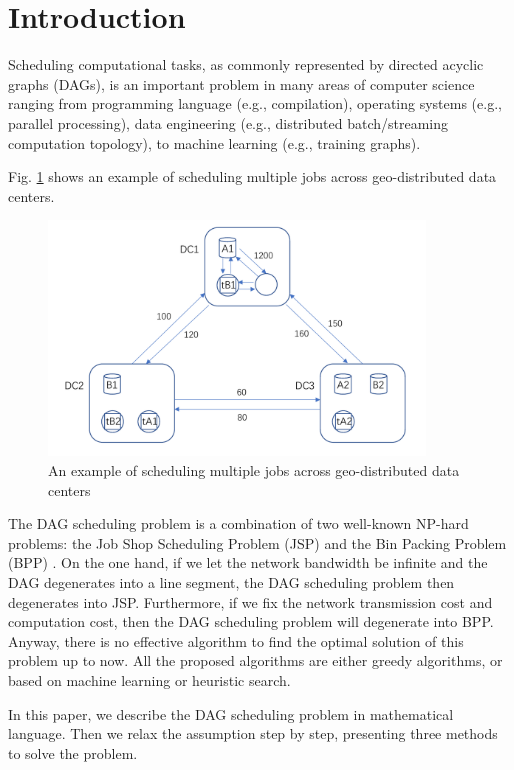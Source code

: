 \documentclass{llncs}
\begin{document}
\section{Introduction}

    Scheduling computational tasks, as commonly represented by directed acyclic graphs (DAGs), is an important problem in many areas of computer science ranging from programming language (e.g., compilation), operating systems (e.g., parallel processing), data engineering (e.g., distributed batch/streaming computation topology), to machine learning (e.g., training graphs). 
    
    Fig. \ref{fig:intro} shows an example of scheduling multiple jobs across geo-distributed data centers.
    \begin{figure}
        \centering
        \includegraphics[width=10cm]{Figures/Intro.pdf}
        \caption{An example of scheduling multiple jobs across
            geo-distributed data centers}
        \label{fig:intro}
    \end{figure}
    
    The DAG scheduling problem is a combination of two well-known NP-hard problems: the Job Shop Scheduling Problem (JSP) \cite{ref_6} and the Bin Packing Problem (BPP) \cite{ref_7,ref_8}. On the one hand, if we let the network bandwidth be infinite and the DAG degenerates into a line segment, the DAG scheduling problem then degenerates into JSP. Furthermore, if we fix the network transmission cost and computation cost, then the DAG scheduling problem will degenerate into BPP. Anyway, there is no effective algorithm to find the optimal solution of this problem up to now. All the proposed algorithms are either greedy algorithms, or based on machine learning \cite{ref_9} or heuristic search.

    In this paper, we describe the DAG scheduling problem in mathematical language. Then we relax the assumption step by step, presenting three methods to solve the problem.
    
\end{document}
